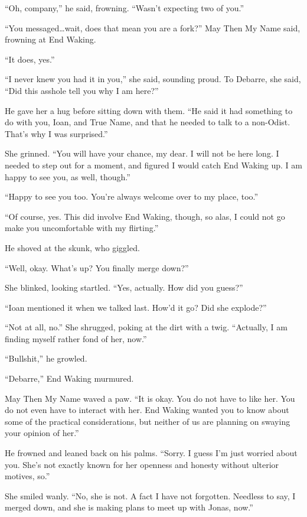 ``Oh, company,'' he said, frowning. ``Wasn't expecting two of you.''

``You messaged\ldots wait, does that mean you are a fork?'' May Then My Name said, frowning at End Waking.

``It does, yes.''

``I never knew you had it in you,'' she said, sounding proud. To Debarre, she said, ``Did this asshole tell you why I am here?''

He gave her a hug before sitting down with them. ``He said it had something to do with you, Ioan, and True Name, and that he needed to talk to a non-Odist. That's why I was surprised.''

She grinned. ``You will have your chance, my dear. I will not be here long. I needed to step out for a moment, and figured I would catch End Waking up. I am happy to see you, as well, though.''

``Happy to see you too. You're always welcome over to my place, too.''

``Of course, yes. This did involve End Waking, though, so alas, I could not go make you uncomfortable with my flirting.''

He shoved at the skunk, who giggled.

``Well, okay. What's up? You finally merge down?''

She blinked, looking startled. ``Yes, actually. How did you guess?''

``Ioan mentioned it when we talked last. How'd it go? Did she explode?''

``Not at all, no.'' She shrugged, poking at the dirt with a twig. ``Actually, I am finding myself rather fond of her, now.''

``Bullshit,'' he growled.

``Debarre,'' End Waking murmured.

May Then My Name waved a paw. ``It is okay. You do not have to like her. You do not even have to interact with her. End Waking wanted you to know about some of the practical considerations, but neither of us are planning on swaying your opinion of her.''

He frowned and leaned back on his palms. ``Sorry. I guess I'm just worried about you. She's not exactly known for her openness and honesty without ulterior motives, so.''

She smiled wanly. ``No, she is not. A fact I have not forgotten. Needless to say, I merged down, and she is making plans to meet up with Jonas, now.''


